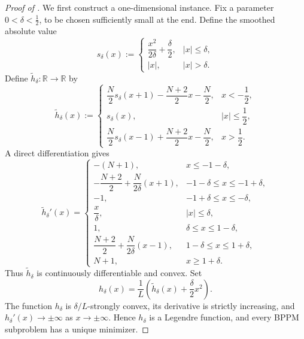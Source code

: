 \documentclass[10pt,a4paper]{amsart}
\newcommand{\reals}{\mathbb{R}}
\begin{document}
\begin{proof}[Proof of ]
We first construct a one-dimensional instance.
Fix a parameter $0<\delta<\frac12$, to be chosen sufficiently small at the end.
Define the smoothed absolute value
\[
    s_\delta(x)
    :=
    \begin{cases}
        \dfrac{x^2}{2\delta}+\dfrac{\delta}{2}, & |x|\le\delta,\\[0.6em]
        |x|, & |x|>\delta.
    \end{cases}
\]
Define $\widetilde h_\delta:\reals\to\reals$ by
\[
\widetilde h_\delta(x)
:=
\begin{cases}
\dfrac{N}{2}s_\delta(x+1)-\dfrac{N+2}{2}x-\dfrac{N}{2},
    & x<-\dfrac12,\\[0.8em]
s_\delta(x), & |x|\le\dfrac12,\\[0.8em]
\dfrac{N}{2}s_\delta(x-1)+\dfrac{N+2}{2}x-\dfrac{N}{2},
    & x>\dfrac12.
\end{cases}
\]
A direct differentiation gives
\begin{equation}
\widetilde h_\delta'(x)
=
\begin{cases}
-(N+1), & x\le -1-\delta,\\
-\dfrac{N+2}{2}+\dfrac{N}{2\delta}(x+1),
    & -1-\delta\le x\le -1+\delta,\\[0.4em]
-1, & -1+\delta\le x\le -\delta,\\
\dfrac{x}{\delta}, & |x|\le\delta,\\[0.4em]
1, & \delta\le x\le 1-\delta,\\
\dfrac{N+2}{2}+\dfrac{N}{2\delta}(x-1),
    & 1-\delta\le x\le 1+\delta,\\[0.4em]
N+1, & x\ge 1+\delta.
\end{cases}
    \label{eq:bppm-tight-h-tilde-derivative}
\end{equation}
Thus $\widetilde h_\delta$ is continuously differentiable and convex.
Set
\begin{equation}
    h_\delta(x)
    =
    \frac{1}{L}\left(\widetilde h_\delta(x)+\frac{\delta}{2}x^2\right).
    \label{eq:bppm-tight-h-def}
\end{equation}
The function $h_\delta$ is $\delta/L$-strongly convex, its derivative is strictly increasing, and $h_\delta'(x)\to\pm\infty$ as $x\to\pm\infty$.
Hence $h_\delta$ is a Legendre function, and every BPPM subproblem has a unique minimizer.


\end{proof}
\end{document}
